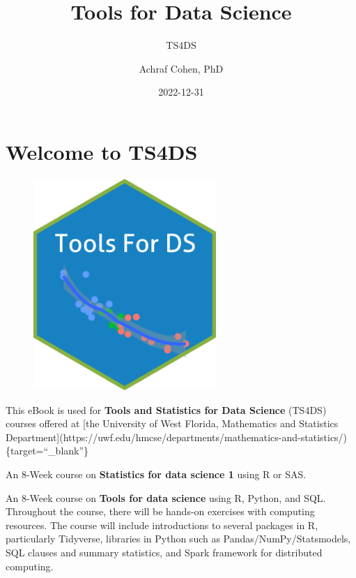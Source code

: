 \documentclass[
  letterpaper,
  DIV=11,
  numbers=noendperiod]{scrreprt}
\title{Tools for Data Science}
\subtitle{TS4DS}
\author{Achraf Cohen, PhD}
\date{2022-12-31}
\renewcommand*\contentsname{Table of contents}
\newcommand\contentsname{Table of contents}
\begin{document}
\maketitle
\ifdefined\Shaded\renewenvironment{Shaded}{\begin{tcolorbox}[sharp corners, enhanced, frame hidden, interior hidden, breakable, boxrule=0pt, borderline west={3pt}{0pt}{shadecolor}]}{\end{tcolorbox}}\fi

\renewcommand*\contentsname{Table of contents}
{
\hypersetup{linkcolor=}
\setcounter{tocdepth}{2}
\tableofcontents
}

\hypertarget{welcome-to-ts4ds}{%
\chapter*{Welcome to TS4DS}\label{welcome-to-ts4ds}}


\begin{figure}

\includegraphics[width=2.72917in,height=\textheight]{logo.png} \hfill{}

\end{figure}

This eBook is used for \textbf{Tools and Statistics for Data Science}
(TS4DS) courses offered at {[}the University of West Florida,
Mathematics and Statistics
Department{]}(https://uwf.edu/hmcse/departments/mathematics-and-statistics/)\{target=``\_blank''\}

An 8-Week course on \textbf{Statistics for data science 1} using R or
SAS.

An 8-Week course on \textbf{Tools for data science} using R, Python, and
SQL. Throughout the course, there will be hands-on exercises with
computing resources. The course will include introductions to several
packages in R, particularly Tidyverse, libraries in Python such as
Pandas/NumPy/Statsmodels, SQL clauses and summary statistics, and Spark
framework for distributed computing.
\end{document}
